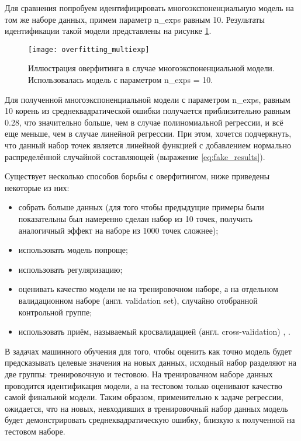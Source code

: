     Для сравнения попробуем идентифицировать многоэкспоненциальную модель на 
    том же наборе данных, примем параметр n\_exps равным 10. Результаты 
    идентификации такой модели представлены на рисунке 
    \ref{pic:overfitting_multiexp}.

    \begin{figure}[!htp]
        \centering
        \texttt{[image: overfitting\_multiexp]}
        \caption{Иллюстрация оверфитинга в случае многоэкспоненциальной модели.
                 Использовалась модель с параметром n\_exps = 10.}
        \label{pic:overfitting_multiexp}
    \end{figure}

    Для полученной многоэкспоненциальной модели с параметром n\_exps, равным 10
    корень из среднеквадратической ошибки получается приблизительно равным 0.28,
    что значительно больше, чем в случае полиномиальной регрессии, и всё еще 
    меньше, чем в случае линейной регрессии. При этом, хочется подчеркнуть, что
    данный набор точек является линейной функцией с добавлением нормально
    распределённой случайной составляющей (выражение \ref{eq:fake_results}).

    Существует несколько способов борьбы с оверфитингом, ниже приведены некоторые
    из них:
    \begin{itemize}
    	\item собрать больше данных (для того чтобы предыдущие примеры были 
    	показательны был намеренно сделан набор из 10 точек, получить аналогичный
    	эффект на наборе из 1000 точек сложнее);
    	\item использовать модель попроще;
    	\item использовать регуляризацию;
    	\item оценивать качество модели не на тренировочном наборе, а на отдельном
    	валидационном наборе (англ. validation set), случайно отобранной 
    	контрольной группе;
    	\item использовать приём, называемый кросвалидацией (англ. 
    	cross-validation) \cite{hands_on_ml}, \cite{sklearn_cross_validation}.
    \end{itemize}

    В задачах машинного обучения для того, чтобы оценить как точно модель 
    будет предсказывать целевые значения на новых данных, исходный набор 
    разделяют на две группы: тренировочную и тестовою. На тренировачном наборе
    данных проводится идентификация модели, а на тестовом только оценивают 
    качество самой финальной модели. Таким образом, применительно к задаче 
    регрессии, ожидается, что на новых, невходивших в тренировочный набор данных
    модель будет демонстрировать среднеквадратическую ошибку, близкую к 
    полученной на тестовом наборе.

